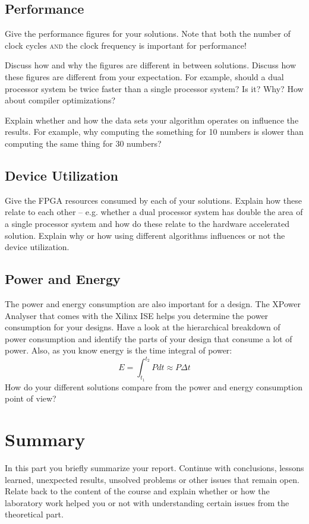\documentclass[11pt]{article}
\begin{document}
\subsection{Performance}
Give the performance figures for your solutions. Note that both the number of clock cycles \textsc{and} the clock frequency is important for performance! 

Discuss how and why the figures are different in between solutions. Discuss how these figures are different from your expectation. For example, should a dual processor system be twice faster than a single processor system? Is it? Why?
How about compiler optimizations? 

Explain whether and how the data sets your algorithm operates on influence the results. For example, why computing the something for 10 numbers is slower than computing the same thing for 30 numbers?

\subsection{Device Utilization}
Give the FPGA resources consumed by each of your solutions. Explain how these relate to each other -- e.g. whether a dual processor system has double the area of a single processor system and how do these relate to the hardware accelerated solution. Explain why or how using different algorithms influences or not the device utilization.

\subsection{Power and Energy}
The power and energy consumption are also important for a design. The XPower Analyser that comes with the Xilinx ISE helps you determine the power consumption for your designs. Have a look at the hierarchical breakdown of power consumption and identify the parts of your design that consume a lot of power. Also, as you know energy is the time integral of power:
\begin{equation}
E = \int_{t_1}^{t_2} P dt \approx P \Delta t
\end{equation}
How do your different solutions compare from the power and energy consumption point of view?

\section{Summary}
In this part you briefly summarize your report. Continue with conclusions, lessons learned, unexpected results, unsolved problems or other issues that remain open. Relate back to the content of the course and explain whether or how the laboratory work helped you or not with understanding certain issues from the theoretical part.



\end{document}
